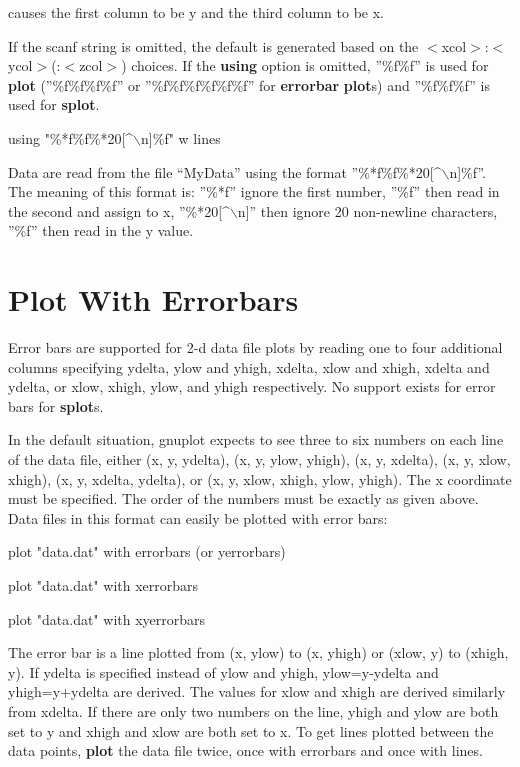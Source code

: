 
causes the first column to be y and the third column to be x.

If the scanf string is omitted, the default is generated based on the
$<$xcol$>$:$<$ycol$>$(:$<$zcol$>$) choices. If the {\bf using} option
is omitted, ''\%f\%f'' is used for {\bf plot} (''\%f\%f\%f\%f'' or
''\%f\%f\%f\%f\%f\%f'' for {\bf errorbar} {\bf plot}s) and
''\%f\%f\%f'' is used for {\bf splot}.

 {using "\%*f\%f\%*20[^$\backslash$n]\%f" w lines}

Data are read from the file ``MyData'' using the format
''\%*f\%f\%*20[^$\backslash$n]\%f''. The meaning of this format is:
''\%*f'' ignore the first number, ''\%f'' then read in the second and
assign to x, ''\%*20[^$\backslash$n]'' then ignore 20 non-newline
characters, ''\%f'' then read in the y value.

\section{Plot With Errorbars}
Error bars are supported for 2-d data file plots by reading one to
four additional columns specifying ydelta, ylow and yhigh, xdelta,
xlow and xhigh, xdelta and ydelta, or xlow, xhigh, ylow, and yhigh
respectively. No support exists for error bars for {\bf splot}s.

In the default situation, gnuplot expects to see three to six
numbers on each line of the data file, either (x, y, ydelta),
(x, y, ylow, yhigh), (x, y, xdelta), (x, y, xlow, xhigh), 
(x, y, xdelta, ydelta), or (x, y, xlow, xhigh, ylow, yhigh). The x 
coordinate must be specified. The order of the numbers must be exactly 
as given above. Data files in this format can easily be plotted with error 
bars:

        plot "data.dat" with errorbars (or yerrorbars)

        plot "data.dat" with xerrorbars

        plot "data.dat" with xyerrorbars

The error bar is a line plotted from (x, ylow) to (x,
yhigh) or (xlow, y) to (xhigh, y). If ydelta is specified instead 
of ylow and yhigh, ylow=y-ydelta and yhigh=y+ydelta are derived. The
values for xlow and xhigh are derived similarly from xdelta. If there
are only two numbers on the line, yhigh and ylow are both set to
y and xhigh and xlow are both set to x. To get lines plotted between 
the data points, {\bf plot} the data file twice, once with errorbars and 
once with lines.

